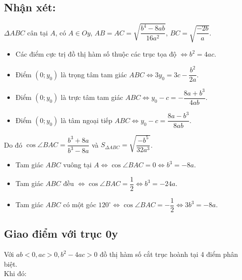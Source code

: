 \begin{itemize}
\begin{center}
\end{center}
\vspace{0.5cm}
\subsection{Nhận xét:}
$\Delta ABC$ cân tại $A$, có $A \in Oy$, $AB = AC = \sqrt{\dfrac{b^4 - 8ab}{16a^2}}$, $BC = \sqrt{\dfrac{-2b}{a}}$.

\begin{itemize}
    \item Các điểm cực trị đồ thị hàm số thuộc các trục tọa độ $\Leftrightarrow b^2 = 4ac$.
    \item Điểm $(0; y_0)$ là trọng tâm tam giác $ABC \Leftrightarrow 3y_0 = 3c - \dfrac{b^2}{2a}$.
    \item Điểm $(0; y_0)$ là trực tâm tam giác $ABC \Leftrightarrow y_0 - c = -\dfrac{8a + b^3}{4ab}$.
    \item Điểm $(0; y_0)$ là tâm ngoại tiếp $ABC \Leftrightarrow y_0 - c = \dfrac{8a - b^3}{8ab}$.
\end{itemize}

\noindent Do đó $\cos \angle BAC = \dfrac{b^3 + 8a}{b^3 - 8a}$ và $S_{\Delta ABC} = \sqrt{\dfrac{-b^5}{32a^3}}$.

\begin{itemize}
    \item Tam giác $ABC$ vuông tại $A \Leftrightarrow \cos \angle BAC = 0 \Leftrightarrow b^3 = -8a$.
    \item Tam giác $ABC$ đều $\Leftrightarrow \cos \angle BAC = \dfrac{1}{2} \Leftrightarrow b^3 = -24a$.
    \item Tam giác $ABC$ có một góc $120^\circ \Leftrightarrow \cos \angle BAC = -\dfrac{1}{2} \Leftrightarrow 3b^3 = -8a$.
\end{itemize}
\subsection{Giao điểm với trục 0y}
\noindent Với $ab < 0, ac > 0, b^2 - 4ac > 0$ đồ thị hàm số cắt trục hoành tại 4 điểm phân biệt. \\
Khi đó:


\end{itemize}
